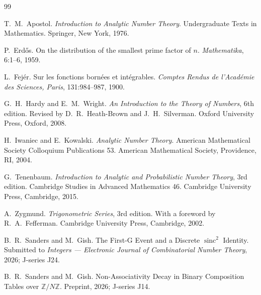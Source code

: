 \documentclass[11pt,reqno]{amsart}
\theoremstyle{plain}
\theoremstyle{definition}
\theoremstyle{remark}
\DeclareMathOperator{\sinc}{sinc}
\begin{document}
\begin{thebibliography}{99}

T.~M.~Apostol.
\newblock \emph{Introduction to Analytic Number Theory}.
\newblock Undergraduate Texts in Mathematics. Springer, New York, 1976.

P.~Erd\H{o}s.
\newblock On the distribution of the smallest prime factor of $n$.
\newblock \emph{Mathematika}, 6:1--6, 1959.

L.~Fej\'{e}r.
\newblock Sur les fonctions born\'{e}es et int\'{e}grables.
\newblock \emph{Comptes Rendus de l'Acad\'{e}mie des Sciences, Paris},
131:984--987, 1900.

G.~H.~Hardy and E.~M.~Wright.
\newblock \emph{An Introduction to the Theory of Numbers}, 6th edition.
\newblock Revised by D.~R.~Heath-Brown and J.~H.~Silverman.
\newblock Oxford University Press, Oxford, 2008.

H.~Iwaniec and E.~Kowalski.
\newblock \emph{Analytic Number Theory}.
\newblock American Mathematical Society Colloquium Publications 53.
\newblock American Mathematical Society, Providence, RI, 2004.

G.~Tenenbaum.
\newblock \emph{Introduction to Analytic and Probabilistic Number Theory},
3rd edition.
\newblock Cambridge Studies in Advanced Mathematics 46. Cambridge
University Press, Cambridge, 2015.

A.~Zygmund.
\newblock \emph{Trigonometric Series}, 3rd edition.
\newblock With a foreword by R.~A.~Fefferman.
\newblock Cambridge University Press, Cambridge, 2002.

B.~R.~Sanders and M.~Gish.
\newblock The First-G Event and a Discrete $\sinc^{2}$ Identity.
\newblock Submitted to \emph{Integers --- Electronic Journal of
Combinatorial Number Theory}, 2026; J-series J24.

B.~R.~Sanders and M.~Gish.
\newblock Non-Associativity Decay in Binary Composition Tables over
$\mathbb{Z}/N\mathbb{Z}$.
\newblock Preprint, 2026; J-series J14.

\end{thebibliography}
\end{document}
